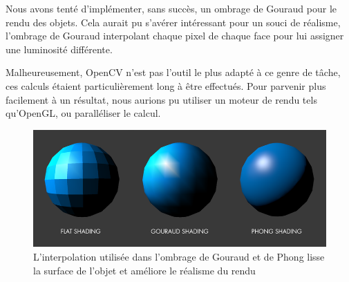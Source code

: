     Nous avons tenté d'implémenter, sans succès, un ombrage de Gouraud pour le rendu des objets. Cela aurait pu s'avérer intéressant pour un souci de réalisme, l'ombrage de Gouraud interpolant chaque pixel de chaque face pour lui assigner une luminosité différente.

    Malheureusement, OpenCV n'est pas l'outil le plus adapté à ce genre de tâche, ces calculs étaient particulièrement long à être effectués. Pour parvenir plus facilement à un résultat, nous aurions pu utiliser un moteur de rendu tels qu'OpenGL, ou paralléliser le calcul.

    \begin{figure}[!h]
        \centering
        \includegraphics[scale=0.25]{img/shading.png}
        \caption{L'interpolation utilisée dans l'ombrage de Gouraud et de Phong lisse la surface de l'objet et améliore le réalisme du rendu}
    \end{figure}